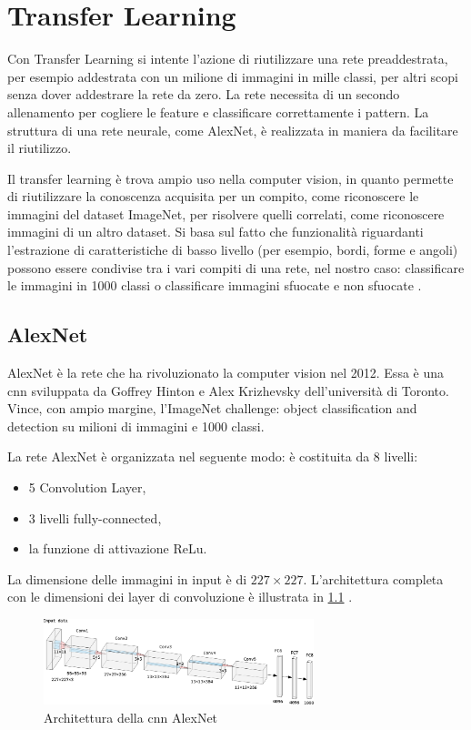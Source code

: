 \chapter{Transfer Learning}\label{transfer-learning}

Con Transfer Learning si intente l'azione di riutilizzare una rete preaddestrata, per esempio addestrata con un milione di immagini in mille classi, per altri scopi senza dover addestrare la rete da zero. La rete necessita di un secondo allenamento per cogliere le feature e classificare correttamente i pattern. La struttura di una rete neurale, come AlexNet, è realizzata in maniera da facilitare il riutilizzo. 

Il transfer learning è trova ampio uso nella computer vision, in quanto permette di riutilizzare la conoscenza acquisita per un
compito, come riconoscere le immagini del dataset ImageNet, per risolvere quelli correlati, come riconoscere immagini di un altro dataset. Si basa sul fatto che
funzionalità riguardanti l'estrazione di caratteristiche di basso livello
(per esempio, bordi, forme e angoli) possono essere condivise tra i vari compiti di una rete, nel nostro caso: classificare le immagini in 1000 classi o classificare immagini sfuocate e non sfuocate \cite{patrini_tl}.

\section{AlexNet}\label{alexnet}
AlexNet è la rete che ha rivoluzionato la computer vision nel 2012. Essa è una \gls{cnn} sviluppata
da Goffrey Hinton e Alex Krizhevsky dell’università di Toronto. Vince, con ampio margine, 
l’ImageNet challenge: object classification and detection su milioni di immagini e 1000 classi.

La rete AlexNet è organizzata nel seguente modo: è costituita da 8 livelli:
\begin{itemize}
    \item 5 \gls{Convolution Layer},
    \item 3 livelli \gls{fully-connected},
    \item la funzione di attivazione \gls{ReLu}.
\end{itemize}
La dimensione delle immagini in input è di \(227\times 227\). L'architettura completa con le dimensioni dei layer di \gls{convoluzione} è illustrata in \cref{fig:alexnet} \cite{alexnet}.  

\begin{figure}[ht]
    \centering
    \includegraphics[width=0.7\textwidth]{addestramento-rete-neurale/alexnet.pdf}
    \caption{Architettura della \gls{cnn} AlexNet}
    \label{fig:alexnet}
\end{figure}

